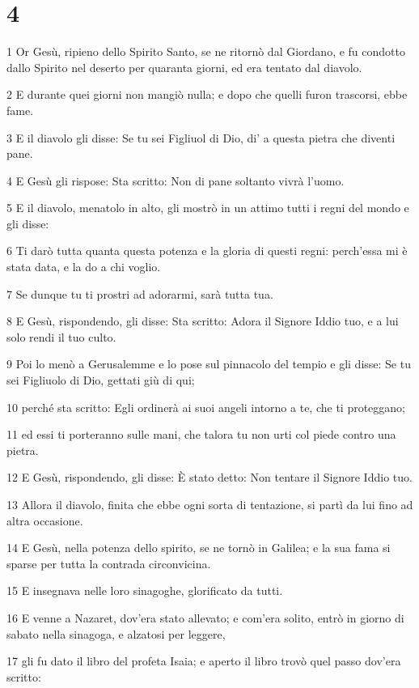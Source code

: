 \chapter{4}

\par 1 Or Gesù, ripieno dello Spirito Santo, se ne ritornò dal Giordano, e fu condotto dallo Spirito nel deserto per quaranta giorni, ed era tentato dal diavolo.
\par 2 E durante quei giorni non mangiò nulla; e dopo che quelli furon trascorsi, ebbe fame.
\par 3 E il diavolo gli disse: Se tu sei Figliuol di Dio, di' a questa pietra che diventi pane.
\par 4 E Gesù gli rispose: Sta scritto: Non di pane soltanto vivrà l'uomo.
\par 5 E il diavolo, menatolo in alto, gli mostrò in un attimo tutti i regni del mondo e gli disse:
\par 6 Ti darò tutta quanta questa potenza e la gloria di questi regni: perch'essa mi è stata data, e la do a chi voglio.
\par 7 Se dunque tu ti prostri ad adorarmi, sarà tutta tua.
\par 8 E Gesù, rispondendo, gli disse: Sta scritto: Adora il Signore Iddio tuo, e a lui solo rendi il tuo culto.
\par 9 Poi lo menò a Gerusalemme e lo pose sul pinnacolo del tempio e gli disse: Se tu sei Figliuolo di Dio, gettati giù di qui;
\par 10 perché sta scritto: Egli ordinerà ai suoi angeli intorno a te, che ti proteggano;
\par 11 ed essi ti porteranno sulle mani, che talora tu non urti col piede contro una pietra.
\par 12 E Gesù, rispondendo, gli disse: È stato detto: Non tentare il Signore Iddio tuo.
\par 13 Allora il diavolo, finita che ebbe ogni sorta di tentazione, si partì da lui fino ad altra occasione.
\par 14 E Gesù, nella potenza dello spirito, se ne tornò in Galilea; e la sua fama si sparse per tutta la contrada circonvicina.
\par 15 E insegnava nelle loro sinagoghe, glorificato da tutti.
\par 16 E venne a Nazaret, dov'era stato allevato; e com'era solito, entrò in giorno di sabato nella sinagoga, e alzatosi per leggere,
\par 17 gli fu dato il libro del profeta Isaia; e aperto il libro trovò quel passo dov'era scritto:
